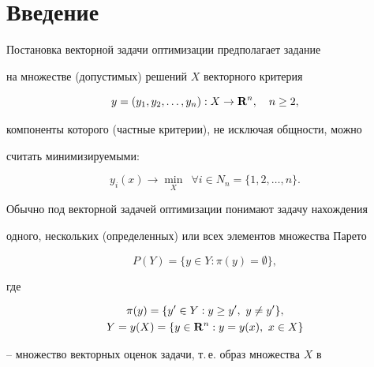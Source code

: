  


 




 


\maketitle 


\label{begin} 


 


\section*{Введение} 


 


Постановка векторной задачи оптимизации предполагает задание 


на множестве (допустимых) решений $X$ векторного критерия 


$$ 


y=(y_1,y_2,\dotsc,y_n):X\to\bold R^n,\quad n\ge 2, 


$$ 


компоненты которого (частные критерии), не исключая общности, можно 


считать минимизируемыми: 


$$ 


y_i(x)\to\min_X\ \; \forall i\in N_n=\{1,2,\dotsc,n\}. 


$$ 


Обычно под векторной задачей оптимизации понимают задачу нахождения 


одного, нескольких (определенных) или всех элементов множества Парето 


$$ 


P(Y)=\{y\in Y:\pi(y)=\emptyset\}, 


$$ 


где 


\begin{gather*} 


\pi(y)=\{y'\in Y:y\ge y',\ y\ne y'\},\\ 


Y=y(X)=\{y\in\bold R^n:y=y(x),\ x\in X\} 


\end{gather*} 


-- множество векторных оценок задачи, т.\,е. образ множества $X$ в  


